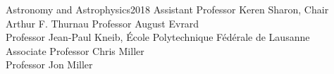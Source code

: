 \documentclass[reqno,12pt,oneside]{report} %
\theoremstyle{plain}
\theoremstyle{definition}
\theoremstyle{remark}
\numberwithin{theorem}{chapter}     %
\begin{document}

{Astronomy and Astrophysics}{2018}
{Assistant Professor Keren Sharon, Chair\\
 Arthur F. Thurnau Professor August Evrard\\
 Professor Jean-Paul Kneib, \'{E}cole Polytechnique F\'{e}d\'{e}rale de Lausanne\\
 Associate Professor Chris Miller\\
 Professor Jon Miller}

\initializefrontsections



\makeatletter
\if@twoside \setcounter{page}{4} \else \setcounter{page}{1} \fi
\makeatother
 

\startacknowledgementspage

\label{Acknowledgements}

%

\tableofcontents     %
\listoftables        %
\listoffigures       %
\listofappendices    %

\startabstractpage

\label{Abstract}

\startthechapters 
\end{document}
